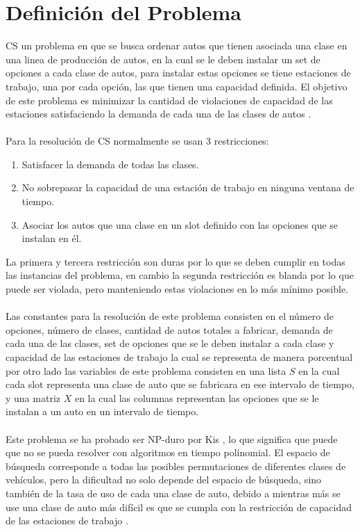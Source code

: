 \documentclass[letter, 10pt]{article}
\begin{document}
\section{Definici\'on del Problema}
CS un problema en que se busca ordenar autos que tienen asociada una clase en una linea de producci\'on de autos, en la cual se le deben instalar un set de opciones a cada clase de autos, para instalar estas opciones se tiene estaciones de trabajo, una por cada opci\'on, las que tienen una capacidad definida. El objetivo de este problema es minimizar la cantidad de violaciones de capacidad de las estaciones satisfaciendo la demanda de cada una de las clases de autos \cite{Dincbas}. 
\\\\ 
Para la resoluci\'on de CS normalmente se usan 3 restricciones:
\begin{enumerate}
    \item Satisfacer la demanda de todas las clases.
    \item No sobrepasar la capacidad de una estaci\'on de trabajo en ninguna ventana de tiempo.
    \item Asociar los autos que una clase en un slot definido con las opciones que se instalan en \'el.
\end{enumerate}
 La primera y tercera restricci\'on son duras por lo que se deben cumplir en todas las instancias del problema, en cambio la segunda restricci\'on es blanda por lo que puede ser violada, pero manteniendo estas violaciones en lo m\'as m\'inimo posible.
\\\\
Las constantes para la resoluci\'on de este problema consisten en el n\'umero de opciones, n\'umero de clases, cantidad de autos totales a fabricar, demanda de cada una de las clases, set de opciones que se le deben instalar a cada clase y capacidad de las estaciones de trabajo la cual se representa de manera porcentual por otro lado las variables de este problema consisten en una lista $S$ en la cual cada slot representa una clase de auto que se fabricara en ese intervalo de tiempo, y una matriz $X$ en la cual las columnas representan las opciones que se le instalan a un auto en un intervalo de tiempo. 
\\\\
Este problema se ha probado ser NP-duro por Kis \cite{Tamas}, lo que significa que puede que no se pueda resolver con algoritmos en tiempo polinomial. El espacio de b\'usqueda corresponde a todas las posibles permutaciones de diferentes clases de veh\'iculos, pero la dificultad no solo depende del espacio de b\'usqueda, sino tambi\'en de la tasa de uso de cada una clase de auto, debido a mientras m\'as se use una clase de auto m\'as dif\'icil es que se cumpla con la restricci\'on de capacidad de las estaciones de trabajo \cite{Lin}. 
\end{document}
